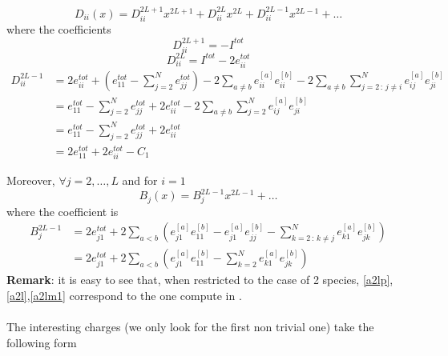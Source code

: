 \documentclass[11pt]{article}
\numberwithin{equation}{section}
\begin{document}
\begin{equation}
	D_{ii}(x)=D_{ii}^{2L+1}x^{2L+1}+D_{ii}^{2L}x^{2L}+D_{ii}^{2L-1}x^{2L-1}+\ldots
\end{equation}
where the coefficients
\begin{equation}\label{a2lp}
	D_{ii}^{2L+1}=-I^{tot}
\end{equation}\begin{equation}\label{a2l}
	D_{ii}^{2L}=I^{tot}-2e_{ii}^{tot}
\end{equation}
\begin{equation}\label{a2lm1}
	\begin{split}
		D_{ii}^{2L-1}&=2e_{ii}^{tot}+\left(e_{11}^{tot}-\sum_{j=2}^{N}e_{jj}^{tot}\right)-2\sum_{a\neq b}e_{ii}^{[a]}e_{ii}^{[b]}-2\sum_{a\neq b}\sum_{j=2\,:\,j\neq i}^{N}e_{ij}^{[a]}e_{ji}^{[b]}\\
		&=e_{11}^{tot}-\sum_{j=2}^{N}e_{jj}^{tot}+2e_{ii}^{tot}-2\sum_{a\neq b}\sum_{j=2}^{N}e_{ij}^{[a]}e_{ji}^{[b]}\\
		&=e_{11}^{tot}-\sum_{j=2}^{N}e_{jj}^{tot}+2e_{ii}^{tot}\\
		&=2e_{11}^{tot}+2e_{ii}^{tot}-C_1
	\end{split}
\end{equation}

Moreover, $\forall j=2,\ldots,L$ and for $i=1$
\begin{equation}
	B_{j}(x)=B_{j}^{2L-1}x^{2L-1}+\ldots
\end{equation}
where the coefficient is 
\begin{equation}\label{b}
\begin{split}
	B_{j}^{2L-1}&=2e_{j1}^{tot}+2\sum_{a< b}\left(e_{j1}^{[a]}e_{11}^{[b]}-e_{j1}^{[a]}e_{jj}^{[b]}-\sum_{k=2\,:\,k\neq j}^{N}e_{k1}^{[a]}e_{jk}^{[b]}\right)\\
	&=2e_{j1}^{tot}+2\sum_{a< b}\left(e_{j1}^{[a]}e_{11}^{[b]}-\sum_{k=2}^{N}e_{k1}^{[a]}e_{jk}^{[b]}\right)
	\end{split}
\end{equation}
\textbf{Remark}: it is easy to see that, when restricted to the case of 2 species,  \eqref{a2lp},\eqref{a2l},\eqref{a2lm1} correspond to the one compute in \cite{frassek2020eigenstates}. \\ \\
The interesting charges (we only look for the first non trivial one) take the following form  
\end{document}
